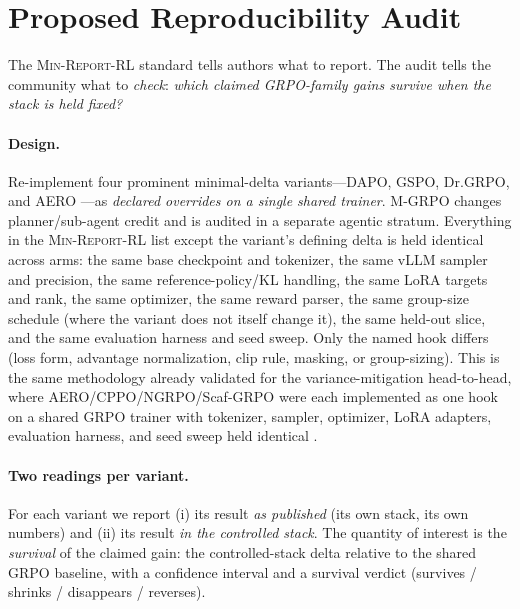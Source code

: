 \documentclass[11pt]{article}
\newcommand{\minreport}{\textsc{Min-Report-RL}}
\begin{document}
\section{Proposed Reproducibility Audit}
\label{sec:audit}

The \minreport{} standard tells authors what to report. The audit tells the
community what to \emph{check}: \emph{which claimed GRPO-family gains survive
when the stack is held fixed?}

\paragraph{Design.}
Re-implement four prominent minimal-delta variants---DAPO, GSPO, Dr.GRPO, and
AERO \cite{yu2025dapo,qwen2025gspo,tong2025drgrpo,zhang2026aero}---as
\emph{declared overrides on a single shared trainer}. M-GRPO
\cite{hong2025mgrpo} changes planner/sub-agent credit and is audited in a
separate agentic stratum. Everything
in the \minreport{} list except the variant's defining delta is held identical
across arms: the same base checkpoint and tokenizer, the same vLLM sampler and
precision, the same reference-policy/KL handling, the same LoRA targets and
rank, the same optimizer, the same reward parser, the same group-size schedule
(where the variant does not itself change it), the same held-out slice, and the
same evaluation harness and seed sweep. Only the named hook differs (loss form,
advantage normalization, clip rule, masking, or group-sizing). This is the same
methodology already validated for the variance-mitigation head-to-head, where
AERO/CPPO/NGRPO/Scaf-GRPO were each implemented as one hook on a shared GRPO
trainer with tokenizer, sampler, optimizer, LoRA adapters, evaluation harness,
and seed sweep held identical \cite{zvfaudit2026}.

\paragraph{Two readings per variant.}
For each variant we report (i) its result \emph{as published} (its own stack,
its own numbers) and (ii) its result \emph{in the controlled stack}. The
quantity of interest is the \emph{survival} of the claimed gain: the
controlled-stack delta relative to the shared GRPO baseline, with a confidence
interval and a survival verdict (survives / shrinks / disappears / reverses).
\end{document}
